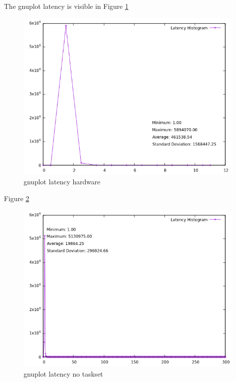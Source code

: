 \documentclass[MMR,Master,english]{twbook}
\begin{document}
The gnuplot latency is visible in Figure \ref{fig:gnuplot_max_max_latency_hardware}
   \begin{figure}[H]
       \centering
       \includegraphics[width=0.8\columnwidth]{masterthesis-documentation/docs/sigmatek/xenomai/hardware/gnuplot_max_latency_hardware.png}
       \caption[gnuplot latency hardware]{gnuplot latency hardware}
       \label{fig:gnuplot_max_max_latency_hardware}
     \end{figure}

     Figure \ref{fig:gnuplot_max_max_latency_default}
     \begin{figure}[H]
         \centering
         \includegraphics[width=0.8\columnwidth]{masterthesis-documentation/docs/sigmatek/xenomai/default/gnuplot_max_latency_default.png}
         \caption[gnuplot latency no taskset]{gnuplot latency no taskset}
         \label{fig:gnuplot_max_max_latency_default}
       \end{figure}
\end{document}
